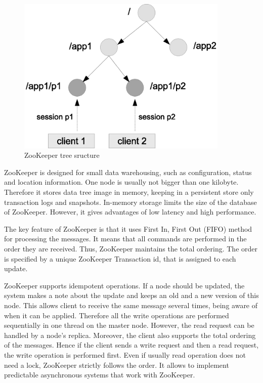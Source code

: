 \begin{figure}
  \centering
  \includegraphics [width=0.9\textwidth]{images/zookeeper_tree}
  \caption{ZooKeeper tree sructure}
  \label{fig:zookeeper_tree}
\end{figure}

ZooKeeper is designed for small data warehousing, such as configuration, status and location information.
One node is usually not bigger than one kilobyte.
Therefore it stores data tree image in memory, keeping in a persistent store only transaction logs and snapshots.
In-memory storage limits the size of the database of ZooKeeper.
However, it gives advantages of low latency and high performance. 

The key feature of ZooKeeper is that it uses First In, First Out (FIFO) method for processing the messages.
It means that all commands are performed in the order they are received.
Thus, ZooKeeper maintains the total ordering.
The order is specified by a unique ZooKeeper Transaction id, that is assigned to each update.
 
ZooKeeper supports idempotent operations.
If a node should be updated, the system makes a note about the update and keeps an old and a new version of this node.
This allows client to receive the same message several times, being aware of when it can be applied.
Therefore all the write operations are performed sequentially in one thread on the master node.
However, the read request can be handled by a node's replica.
Moreover, the client also supports the total ordering of the messages.
Hence if the client sends a write request and then a read request, the write operation is performed first.
Even if usually read operation does not need a lock, ZooKeeper strictly follows the order.
It allows to implement predictable asynchronous systems that work with ZooKeeper.

